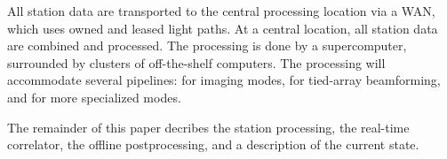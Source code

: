 \documentclass[journal]{IEEEtran}
\begin{document}
All station data are transported to the central processing location via a
WAN, which uses owned and leased light paths.
At a central location, all station data are combined and processed.
The processing is done by a supercomputer, surrounded by clusters of
off-the-shelf computers.
The processing will accommodate several pipelines: for imaging modes,
for tied-array beamforming, and for more specialized modes.

The remainder of this paper decribes the station processing,
the real-time correlator, the offline postprocessing, and a description
of the current state.

 





%
%

\end{document}
